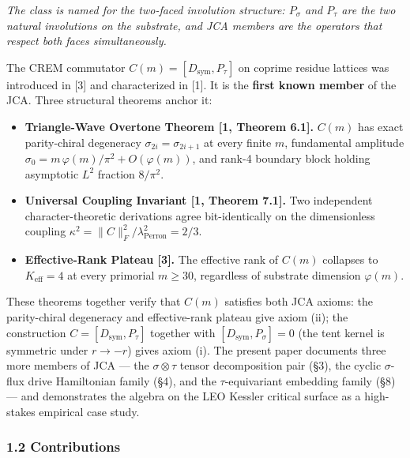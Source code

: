 \documentclass[
]{article}
\providecommand{\tightlist}{%
  \setlength{\itemsep}{0pt}\setlength{\parskip}{0pt}}
\begin{document}
\emph{The class is named for the two-faced involution structure:
\(P_\sigma\) and \(P_\tau\) are the two natural involutions on the
substrate, and JCA members are the operators that respect both faces
simultaneously.}

The CREM commutator \(C(m) = [D_\text{sym}, P_\tau]\) on coprime residue
lattices was introduced in {[}3{]} and characterized in {[}1{]}. It is
the \textbf{first known member} of the JCA. Three structural theorems
anchor it:

\begin{itemize}
\tightlist
\item
  \textbf{Triangle-Wave Overtone Theorem {[}1, Theorem 6.1{]}.} \(C(m)\)
  has exact parity-chiral degeneracy \(\sigma_{2i} = \sigma_{2i+1}\) at
  every finite \(m\), fundamental amplitude
  \(\sigma_0 = m\,\varphi(m)/\pi^2 + O(\varphi(m))\), and rank-4
  boundary block holding asymptotic \(L^2\) fraction \(8/\pi^2\).
\item
  \textbf{Universal Coupling Invariant {[}1, Theorem 7.1{]}.} Two
  independent character-theoretic derivations agree bit-identically on
  the dimensionless coupling
  \(\kappa^2 = \|C\|_F^2 / \lambda_\text{Perron}^2 = 2/3\).
\item
  \textbf{Effective-Rank Plateau {[}3{]}.} The effective rank of
  \(C(m)\) collapses to \(K_\text{eff} = 4\) at every primorial
  \(m \geq 30\), regardless of substrate dimension \(\varphi(m)\).
\end{itemize}

These theorems together verify that \(C(m)\) satisfies both JCA axioms:
the parity-chiral degeneracy and effective-rank plateau give axiom (ii);
the construction \(C = [D_\text{sym}, P_\tau]\) together with
\([D_\text{sym}, P_\sigma] = 0\) (the tent kernel is symmetric under
\(r \to -r\)) gives axiom (i). The present paper documents three more
members of JCA --- the \(\sigma\otimes\tau\) tensor decomposition pair
(§3), the cyclic \(\sigma\)-flux drive Hamiltonian family (§4), and the
\(\tau\)-equivariant embedding family (§8) --- and demonstrates the
algebra on the LEO Kessler critical surface as a high-stakes empirical
case study.

\subsubsection{1.2 Contributions}\label{contributions}
\end{document}
